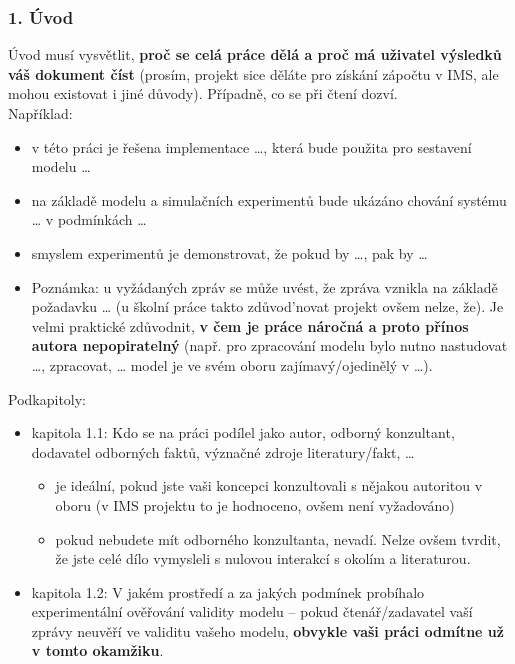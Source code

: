 \documentclass{article}
\begin{document}
\subsubsection{1. Úvod}\label{uxfavod}

Úvod musí vysvětlit, \textbf{proč se celá práce dělá a proč má uživatel
výsledků váš dokument číst} (prosím, projekt sice děláte pro získání
zápočtu v IMS, ale mohou existovat i jiné důvody). Případně, co se při
čtení dozví.\\[2\baselineskip]Například:\\

\begin{itemize}
\tightlist
\item
  v této práci je řešena implementace \ldots{}, která bude použita pro
  sestavení modelu \ldots{}
\item
  na základě modelu a simulačních experimentů bude ukázáno chování
  systému \ldots{} v podmínkách \ldots{}
\item
  smyslem experimentů je demonstrovat, že pokud by \ldots{}, pak by
  \ldots{}
\item
  Poznámka: u vyžádaných zpráv se může uvést, že zpráva vznikla na
  základě požadavku \ldots{} (u školní práce takto zdůvod'novat projekt
  ovšem nelze, že). Je velmi praktické zdůvodnit, \textbf{v čem je práce
  náročná a proto přínos autora nepopiratelný} (např. pro zpracování
  modelu bylo nutno nastudovat \ldots{}, zpracovat, \ldots{} model je ve
  svém oboru zajímavý/ojedinělý v \ldots{}).
\end{itemize}

Podkapitoly:\\

\begin{itemize}
\tightlist
\item
  kapitola 1.1: Kdo se na práci podílel jako autor, odborný konzultant,
  dodavatel odborných faktů, význačné zdroje literatury/fakt, \ldots{}

  \begin{itemize}
  \tightlist
  \item
    je ideální, pokud jste vaši koncepci konzultovali s nějakou
    autoritou v oboru (v IMS projektu to je hodnoceno, ovšem není
    vyžadováno)
  \item
    pokud nebudete mít odborného konzultanta, nevadí. Nelze ovšem
    tvrdit, že jste celé dílo vymysleli s nulovou interakcí s okolím a
    literaturou.
  \end{itemize}
\item
  kapitola 1.2: V jakém prostředí a za jakých podmínek probíhalo
  experimentální ověřování validity modelu -- pokud čtenář/zadavatel
  vaší zprávy neuvěří ve validitu vašeho modelu, \textbf{obvykle vaši
  práci odmítne už v tomto okamžiku}.
\end{itemize}
\end{document}
